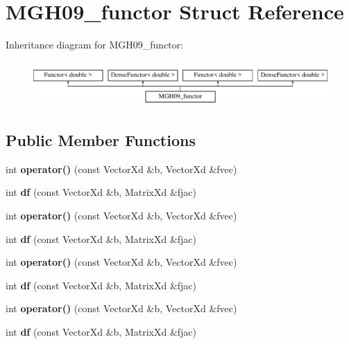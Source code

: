 \hypertarget{struct_m_g_h09__functor}{}\section{M\+G\+H09\+\_\+functor Struct Reference}
\label{struct_m_g_h09__functor}
Inheritance diagram for M\+G\+H09\+\_\+functor\+:\begin{figure}[H]
\begin{center}
\leavevmode
\includegraphics[height=1.728395cm]{struct_m_g_h09__functor}
\end{center}
\end{figure}
\subsection*{Public Member Functions}
\begin{DoxyCompactItemize}
\item 
\mbox{\label{struct_m_g_h09__functor_a885c68b0d6873b25b3d23c8b9f7eeed7}} 
int {\bfseries operator()} (const Vector\+Xd \&b, Vector\+Xd \&fvec)
\item 
\mbox{\label{struct_m_g_h09__functor_a6f7cdd2e6023a17b42bdd243a86e3717}} 
int {\bfseries df} (const Vector\+Xd \&b, Matrix\+Xd \&fjac)
\item 
\mbox{\label{struct_m_g_h09__functor_a885c68b0d6873b25b3d23c8b9f7eeed7}} 
int {\bfseries operator()} (const Vector\+Xd \&b, Vector\+Xd \&fvec)
\item 
\mbox{\label{struct_m_g_h09__functor_a6f7cdd2e6023a17b42bdd243a86e3717}} 
int {\bfseries df} (const Vector\+Xd \&b, Matrix\+Xd \&fjac)
\item 
\mbox{\label{struct_m_g_h09__functor_a885c68b0d6873b25b3d23c8b9f7eeed7}} 
int {\bfseries operator()} (const Vector\+Xd \&b, Vector\+Xd \&fvec)
\item 
\mbox{\label{struct_m_g_h09__functor_a6f7cdd2e6023a17b42bdd243a86e3717}} 
int {\bfseries df} (const Vector\+Xd \&b, Matrix\+Xd \&fjac)
\item 
\mbox{\label{struct_m_g_h09__functor_a885c68b0d6873b25b3d23c8b9f7eeed7}} 
int {\bfseries operator()} (const Vector\+Xd \&b, Vector\+Xd \&fvec)
\item 
\mbox{\label{struct_m_g_h09__functor_a6f7cdd2e6023a17b42bdd243a86e3717}} 
int {\bfseries df} (const Vector\+Xd \&b, Matrix\+Xd \&fjac)
\end{DoxyCompactItemize}

